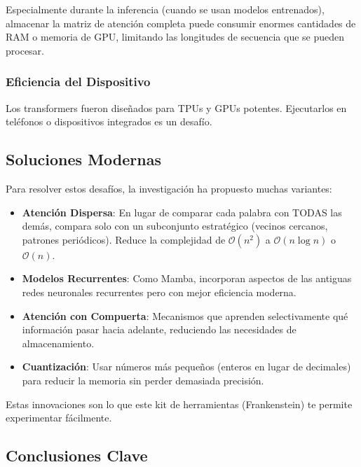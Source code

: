 \documentclass[11pt,a4paper]{article}
\begin{document}
Especialmente durante la inferencia (cuando se usan modelos entrenados), almacenar la matriz de atención completa puede consumir enormes cantidades de RAM o memoria de GPU, limitando las longitudes de secuencia que se pueden procesar.

\subsubsection{Eficiencia del Dispositivo}

Los transformers fueron diseñados para TPUs y GPUs potentes. Ejecutarlos en teléfonos o dispositivos integrados es un desafío.

\subsection{Soluciones Modernas}

Para resolver estos desafíos, la investigación ha propuesto muchas variantes:

\begin{itemize}[leftmargin=*]
    \item \textbf{Atención Dispersa}: En lugar de comparar cada palabra con TODAS las demás, compara solo con un subconjunto estratégico (vecinos cercanos, patrones periódicos). Reduce la complejidad de $\mathcal{O}(n^2)$ a $\mathcal{O}(n \log n)$ o $\mathcal{O}(n)$.
    \item \textbf{Modelos Recurrentes}: Como Mamba, incorporan aspectos de las antiguas redes neuronales recurrentes pero con mejor eficiencia moderna.
    \item \textbf{Atención con Compuerta}: Mecanismos que aprenden selectivamente qué información pasar hacia adelante, reduciendo las necesidades de almacenamiento.
    \item \textbf{Cuantización}: Usar números más pequeños (enteros en lugar de decimales) para reducir la memoria sin perder demasiada precisión.
\end{itemize}

Estas innovaciones son lo que este kit de herramientas (Frankenstein) te permite experimentar fácilmente.

\subsection{Conclusiones Clave}
\end{document}
